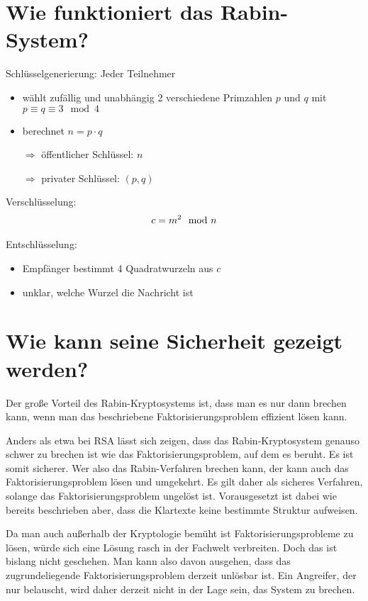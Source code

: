 \documentclass{article}
\begin{document}
	\section*{Wie funktioniert das Rabin-System?}
	Schlüsselgenerierung: Jeder Teilnehmer
	\begin{itemize}
		\item wählt zufällig und unabhängig 2 verschiedene Primzahlen $p$ und $q$ mit $p\equiv q\equiv 3\mod 4$
		\item berechnet $n = p\cdot q$
		\item[$\Rightarrow$] öffentlicher Schlüssel: $n$
		\item[$\Rightarrow$] privater Schlüssel: $(p,q)$
	\end{itemize}

	Verschlüsselung:
	\begin{align}
		c = m^2\mod n \notag
	\end{align}
	
	Entschlüsselung:
	\begin{itemize}
		\item Empfänger bestimmt 4 Quadratwurzeln aus $c$
		\item unklar, welche Wurzel die Nachricht ist
	\end{itemize}
	
	\section*{Wie kann seine Sicherheit gezeigt werden?}
	Der große Vorteil des Rabin-Kryptosystems ist, dass man es nur dann brechen kann, wenn man das beschriebene Faktorisierungsproblem effizient lösen kann.
	
	Anders als etwa bei RSA lässt sich zeigen, dass das Rabin-Kryptosystem genauso schwer zu brechen ist wie das Faktorisierungsproblem, auf dem es beruht. Es ist somit sicherer. Wer also das Rabin-Verfahren brechen kann, der kann auch das Faktorisierungsproblem lösen und umgekehrt. Es gilt daher als sicheres Verfahren, solange das Faktorisierungsproblem ungelöst ist. Vorausgesetzt ist dabei wie bereits beschrieben aber, dass die Klartexte keine bestimmte Struktur aufweisen.
	
	Da man auch außerhalb der Kryptologie bemüht ist Faktorisierungsprobleme zu lösen, würde sich eine Lösung rasch in der Fachwelt verbreiten. Doch das ist bislang nicht geschehen. Man kann also davon ausgehen, dass das zugrundeliegende Faktorisierungsproblem derzeit unlösbar ist. Ein Angreifer, der nur belauscht, wird daher derzeit nicht in der Lage sein, das System zu brechen.
	
\end{document}
